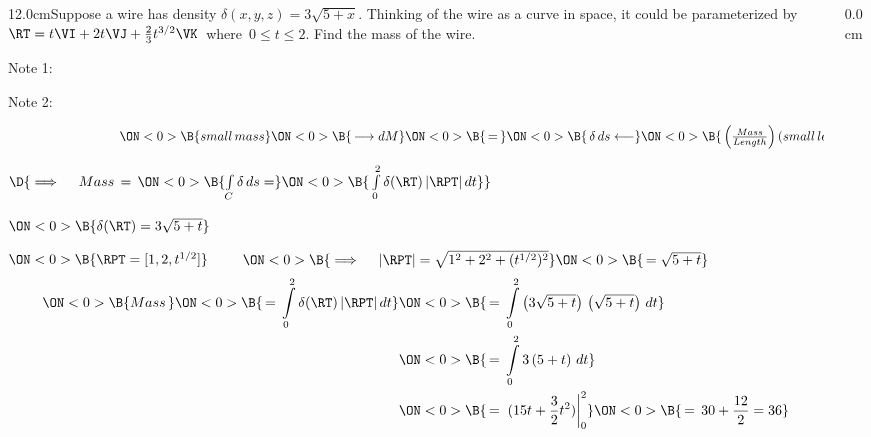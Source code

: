 \begin{frame}
\frametitle{}
\scriptsize
\begin{columns}\begin{column}{12.0cm}\EX Suppose a wire has density $\delta(x,y,z) = 3\sqrt{5+x}$.  Thinking of the wire as a curve in space, it could be parameterized by $\RT = t\VI + 2t\VJ + \frac{2}{3}t^{3/2}\VK$ \,where\, $0 \le t \le 2$. Find the mass of the wire.

Note 1: 


Note 2: 

\vspace{0.2cm}

$\hspace{3.0cm} 
\ON<0>{\B{small \, mass}} 
\ON<0>{\B{\, \longrightarrow dM }}
\ON<0>{\B{\, = \, }}
\ON<0>{\B{\,\delta \, ds \longleftarrow }}
\ON<0>{\B{\, \left(\frac{Mass}{Length}\right) (small \, length)}}$

\vspace{0.2cm}

$\D{\implies \quad Mass \, = \, 
\ON<0>{\B{\int \limits_C \delta \, ds = }}
\ON<0>{\B{\, \int \limits_{0}^{2} \delta(\RT) \, |\RPT|\, dt}}}$

\vspace{0.2cm}
	
	$ 
	\ON<0>{\B{\delta(\RT) = 3\sqrt{5+t}}}$
	
	\vspace{0.2cm}
	
	$ 
	\ON<0>{\B{\RPT = [1,2,t^{1/2}]}}$
	$\qquad   
	\ON<0>{\B{\implies \quad |\RPT| = \sqrt{1^2 + 2^2 + (t^{1/2})^2}}}
	\ON<0>{\B{\, = \sqrt{5 + t}}}$
	\begin{align*}
		\ON<0>{\B{Mass \, }}  
			 \ON<0>{\B{\, = \, \int \limits_{0}^{2} \delta(\RT) \, |\RPT|\, dt}}
			& \ON<0>{\B{\, = \, \int \limits_{0}^{2} \left(3\sqrt{5+t}\right) \, \left(\sqrt{5+t}\right)\, dt}} \\
			& \ON<0>{\B{\, = \, \int \limits_{0}^{2} 3 \left(5+t\right)\, dt}}  \\
			& \ON<0>{\B{\, = \, \left.(15t + \frac{3}{2}t^2) \right|_{0}^{2}}}
			  \ON<0>{\B{\, = \, 30 + \frac{12}{2} = 36}}   \\
	\end{align*}
	

\end{column}\begin{column}{0.0cm}\end{column}\end{columns}
\end{frame}

